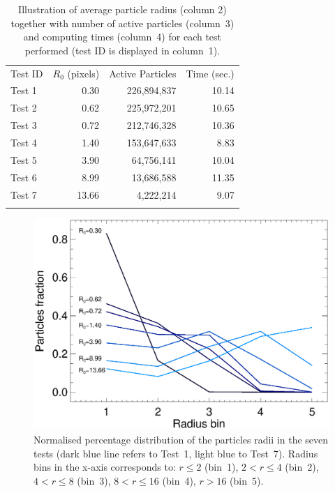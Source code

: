\documentclass[preprint,5pt]{elsarticle}
\begin{document}
\begin{table}
\label{tab:bin}
\begin{center}
\begin{tabular}{lrrr}
\hline\noalign{\smallskip}
Test ID & $R_0$ (pixels) & Active Particles & Time (sec.) \\
\noalign{\smallskip} \hline \noalign{\smallskip}
Test 1  & 0.30   & 226,894,837  & 10.14 \\
Test 2  & 0.62   & 225,972,201  & 10.65 \\
Test 3  & 0.72   & 212,746,328  & 10.36 \\
Test 4  & 1.40   & 153,647,633  & 8.83 \\
Test 5  & 3.90   & 64,756,141   & 10.04 \\
Test 6  & 8.99   & 13,686,588   & 11.35 \\
Test 7  & 13.66  & 4,222,214    & 9.07 \\
\noalign{\smallskip} \hline
\end{tabular}
\end{center}
\caption{Illustration of average particle radius (column 2) together with number of active particles (column~3) and computing times (column~4) for each test performed (test ID is displayed in column~1).}
\end{table}

\begin{figure}
\centering
\includegraphics[scale=0.5]{radii.eps}
\caption{Normalised percentage distribution of the particles radii in the seven tests (dark blue line refers to Test~1, light blue to Test~7). Radius bins in the x-axis corresponds to: $r\le 2$ (bin~1), $2<r\le 4$ (bin~2), $4<r\le 8$ (bin~3), $8<r\le 16$ (bin~4), $r>16$ (bin~5). 
}
\label{fig:radii}
\end{figure}
\end{document}
